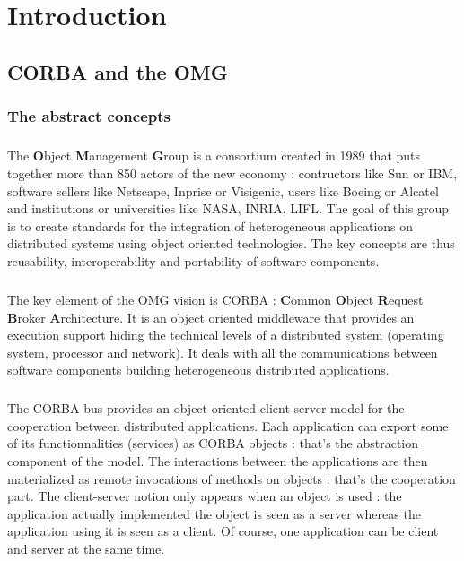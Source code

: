 \chapter{Introduction}

\section{CORBA and the OMG}

\subsection{The abstract concepts}

\paragraph{}The {\bf O}bject {\bf M}anagement {\bf G}roup is a consortium created in 1989 
that puts together more than 850 actors of the new economy :
contructors like Sun or IBM, software sellers like Netscape, Inprise or Visigenic, users like Boeing or Alcatel and institutions or
universities like NASA, INRIA, LIFL. The goal of this group is to create standards for the integration of heterogeneous applications
on distributed systems using object oriented technologies. The key concepts are thus reusability, interoperability and portability
of software components.

\paragraph{}The key element of the OMG vision is CORBA : {\bf C}ommon {\bf O}bject {\bf R}equest {\bf B}roker {\bf A}rchitecture.
It is an object oriented middleware that provides an execution support hiding the technical levels of a distributed system (operating
system, processor and network). It deals with all the communications between software components building heterogeneous distributed
applications.

\paragraph{}The CORBA bus provides an object oriented client-server model for the cooperation between distributed applications.
Each application can export some of its functionnalities (services) as CORBA objects : that's the abstraction component of the model.
The interactions between the applications are then materialized as remote invocations of methods on objects : that's the cooperation part.
The client-server notion only appears when an object is used : the application actually implemented the object is seen as a server
whereas the application using it is seen as a client. Of course, one
application can be client and server at the same time.

